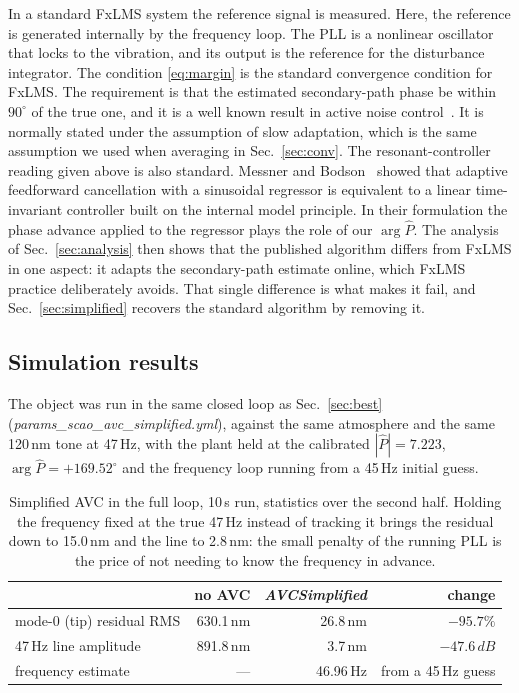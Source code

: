 \documentclass[11pt]{article}
\newcommand{\SI}[2]{#1\,#2}
\begin{document}
In a standard FxLMS system the reference signal is measured.
%
Here, the reference is generated internally by the frequency loop. 
%
The PLL is a nonlinear oscillator that locks to the vibration, and its output is the reference for the disturbance integrator.
%
The condition \eqref{eq:margin} is the standard convergence condition for FxLMS. 
%
The requirement is that the estimated secondary-path phase be within $90^\circ$ of the true one, and it is a well known result in active noise control~\cite{snyder1994,morgan1980,kuo1996}. 
%
It is normally stated under the assumption of slow adaptation, which is the same assumption we used when averaging in Sec.~\ref{sec:conv}.
%
%
The resonant-controller reading given above is also standard. Messner and
Bodson~\cite{messner1995} showed that adaptive feedforward cancellation with
a sinusoidal regressor is equivalent to a linear time-invariant controller
built on the internal model principle. In their formulation the phase advance
applied to the regressor plays the role of our $\arg\hat P$.
%
The analysis of Sec.~\ref{sec:analysis} then shows that the published algorithm differs from FxLMS in one aspect: it adapts the secondary-path estimate online, which FxLMS practice deliberately avoids.
%
That single difference is what makes it fail, and Sec.~\ref{sec:simplified} recovers the standard algorithm by removing it.
%
\subsection{Simulation results}
\label{sec:simplresults}
The object was run in the same closed loop as Sec.~\ref{sec:best}
(\textit{params\_scao\_avc\_simplified.yml}), against the same atmosphere and
the same \SI{120}{nm} tone at \SI{47}{Hz}, with the plant held at the
calibrated $|\hat P|=7.223$, $\arg\hat P=+169.52^\circ$ and the frequency
loop running from a \SI{45}{Hz} initial guess.

\begin{table}
\centering
\begin{tabular}{lrrr}
\toprule
 & no AVC & \textit{AVCSimplified} & change\\
\midrule
mode-0 (tip) residual RMS  & \SI{630.1}{nm} & \SI{26.8}{nm} & $-95.7\%$\\
\SI{47}{Hz} line amplitude & \SI{891.8}{nm} & \SI{3.7}{nm}  & $-\SI{47.6}{dB}$\\
frequency estimate         & ---            & \SI{46.96}{Hz} & from a \SI{45}{Hz} guess\\
\bottomrule
\end{tabular}
\caption{Simplified AVC in the full loop, \SI{10}{s} run, statistics over the
second half. Holding the frequency fixed at the true \SI{47}{Hz} instead of
tracking it brings the residual down to \SI{15.0}{nm} and the line to
\SI{2.8}{nm}: the small penalty of the running PLL is the price of not
needing to know the frequency in advance.}
\label{tab:simplres}
\end{table}
\end{document}

